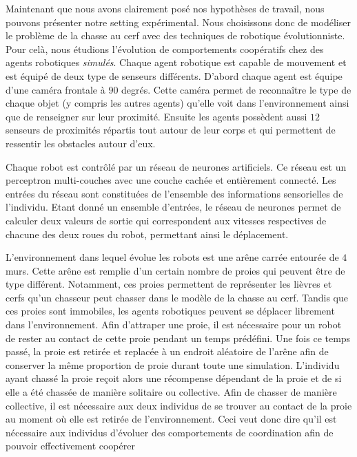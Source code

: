    	Maintenant que nous avons clairement posé nos hypothèses de travail, nous pouvons présenter notre setting expérimental. Nous choisissons donc de modéliser le problème de la chasse au cerf avec des techniques de robotique évolutionniste. Pour celà, nous étudions l'évolution de comportements coopératifs chez des agents robotiques \emph{simulés}. Chaque agent robotique est capable de mouvement et est équipé de deux type de senseurs différents. D'abord chaque agent est équipe d'une caméra frontale à $90$ degrés. Cette caméra permet de reconnaître le type de chaque objet (y compris les autres agents) qu'elle voit dans l'environnement ainsi que de renseigner sur leur proximité. Ensuite les agents possèdent aussi $12$ senseurs de proximités répartis tout autour de leur corps et qui permettent de ressentir les obstacles autour d'eux.

   	Chaque robot est contrôlé par un réseau de neurones artificiels. Ce réseau est un perceptron multi-couches avec une couche cachée et entièrement connecté. Les entrées du réseau sont constituées de l'ensemble des informations sensorielles de l'individu. Etant donné un ensemble d'entrées, le réseau de neurones permet de calculer deux valeurs de sortie qui correspondent aux vitesses respectives de chacune des deux roues du robot, permettant ainsi le déplacement.

   	L'environnement dans lequel évolue les robots est une arêne carrée entourée de $4$ murs. Cette arêne est remplie d'un certain nombre de proies qui peuvent être de type différent. Notamment, ces proies permettent de représenter les lièvres et cerfs qu'un chasseur peut chasser dans le modèle de la chasse au cerf. Tandis que ces proies sont immobiles, les agents robotiques peuvent se déplacer librement dans l'environnement. Afin d'attraper une proie, il est nécessaire pour un robot de rester au contact de cette proie pendant un temps prédéfini. Une fois ce temps passé, la proie est retirée et replacée à un endroit aléatoire de l'arêne afin de conserver la même proportion de proie durant toute une simulation. L'individu ayant chassé la proie reçoit alors une récompense dépendant de la proie et de si elle a été chassée de manière solitaire ou collective. Afin de chasser de manière collective, il est nécessaire aux deux individus de se trouver au contact de la proie au moment où elle est retirée de l'environnement. Ceci veut donc dire qu'il est nécessaire aux individus d'évoluer des comportements de coordination afin de pouvoir effectivement coopérer

